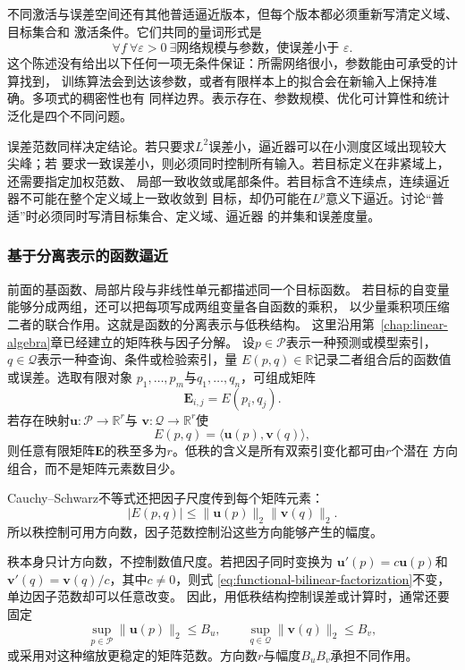 不同激活与误差空间还有其他普适逼近版本，但每个版本都必须重新写清定义域、目标集合和
激活条件。它们共同的量词形式是
\[
  \forall f\ \forall\varepsilon>0\
  \exists\text{网络规模与参数，使误差小于 }\varepsilon.
\]
这个陈述没有给出以下任何一项无条件保证：所需网络很小，参数能由可承受的计算找到，
训练算法会到达该参数，或者有限样本上的拟合会在新输入上保持准确。多项式的稠密性也有
同样边界。表示存在、参数规模、优化可计算性和统计泛化是四个不同问题。

误差范数同样决定结论。若只要求$L^2$误差小，逼近器可以在小测度区域出现较大尖峰；若
要求一致误差小，则必须同时控制所有输入。若目标定义在非紧域上，还需要指定加权范数、
局部一致收敛或尾部条件。若目标含不连续点，连续逼近器不可能在整个定义域上一致收敛到
目标，却仍可能在$L^p$意义下逼近。讨论“普适”时必须同时写清目标集合、定义域、逼近器
的并集和误差度量。

\subsubsection{基于分离表示的函数逼近}
\label{sec:functional-separated-approximation}

前面的基函数、局部片段与非线性单元都描述同一个目标函数。
若目标的自变量能够分成两组，还可以把每项写成两组变量各自函数的乘积，
以少量乘积项压缩二者的联合作用。这就是函数的分离表示与低秩结构。
这里沿用第~\ref{chap:linear-algebra}章已经建立的矩阵秩与因子分解。
设$p\in\mathcal{P}$表示一种预测或模型索引，
$q\in\mathcal{Q}$表示一种查询、条件或检验索引，量
$E(p,q)\in\mathbb{R}$记录二者组合后的函数值或误差。选取有限对象
$p_1,\ldots,p_m$与$q_1,\ldots,q_n$，可组成矩阵
\[
  \bm{E}_{i,j}=E(p_i,q_j).
\]
若存在映射$\bm{u}:\mathcal{P}\to\mathbb{R}^r$与
$\bm{v}:\mathcal{Q}\to\mathbb{R}^r$使
\begin{equation}
  E(p,q)
  =
  \langle\bm{u}(p),\bm{v}(q)\rangle,
  \label{eq:functional-bilinear-factorization}
\end{equation}
则任意有限矩阵$\bm{E}$的秩至多为$r$。低秩的含义是所有双索引变化都可由$r$个潜在
方向组合，而不是矩阵元素数目少。

Cauchy--Schwarz不等式还把因子尺度传到每个矩阵元素：
\[
  |E(p,q)|
  \leq
  \lVert\bm{u}(p)\rVert_2
  \lVert\bm{v}(q)\rVert_2.
\]
所以秩控制可用方向数，因子范数控制沿这些方向能够产生的幅度。

秩本身只计方向数，不控制数值尺度。若把因子同时变换为
$\bm{u}'(p)=c\bm{u}(p)$和
$\bm{v}'(q)=\bm{v}(q)/c$，其中$c\neq0$，则式
\eqref{eq:functional-bilinear-factorization}不变，单边因子范数却可以任意改变。
因此，用低秩结构控制误差或计算时，通常还要固定
\[
  \sup_{p\in\mathcal{P}}\lVert\bm{u}(p)\rVert_2\leq B_u,
  \qquad
  \sup_{q\in\mathcal{Q}}\lVert\bm{v}(q)\rVert_2\leq B_v,
\]
或采用对这种缩放更稳定的矩阵范数。方向数$r$与幅度$B_uB_v$承担不同作用。

